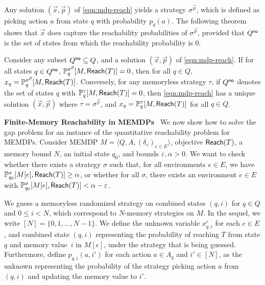 \documentclass[a4paper,USenglish,cleveref, autoref, thm-restate]{lipics-v2021}
\let\epsilon\varepsilon
\def\myparagraph#1{\noindent\textbf{#1}~}
\newcommand{\tuple}[1]{\langle #1 \rangle}
\newcommand*{\pr}{\mathbb{P}}
\newcommand\Reach{\textrm{\sf Reach}}
\begin{document}
Any solution $(\vec{x}, \vec{p})$ of \eqref{eqn:mdp-reach} yields a strategy $\sigma^{\vec{p}}$, 
which is defined as picking action $a$ from state $q$ with probability $p_{q}(a)$. 
The following theorem shows that $\vec{x}$ does capture the reachability probabilities
of $\sigma^{\vec{p}}$, provided that $Q^{\textsf{no}}$ is the set of states from which 
the reachability probability is $0$. 

\begin{theorem}
  \label{thm:mdp-reach-charact}
  Consider any subset $Q^{\textsf{no}} \subseteq Q$, and a solution $(\vec{x}, \vec{p})$ of \eqref{eqn:mdp-reach}.
  If for all states $q \in Q^{\textsf{no}}$, $\pr^{\sigma^{\vec{p}}}_q[M, \Reach(T)] = 0$,
  then for all $q\in Q$, $x_q = \pr^{\sigma^{\vec{p}}}_q[M, \Reach(T)]$.
  Conversely, for any memoryless strategy $\tau$, if $Q^{\textsf{no}}$ denotes the set 
  of states $q$ with $\pr^{\tau}_q[M, \Reach(T)] = 0$, then 
  \eqref{eqn:mdp-reach} has a unique solution $(\vec{x}, \vec{p})$ where $\tau = \sigma^{\vec{p}}$,
  and $x_q = \pr^{\tau}_q[M, \Reach(T)]$ for all $q \in Q$.
\end{theorem}

\myparagraph{Finite-Memory Reachability in MEMDPs}
We now show how to solve the gap problem for an instance of the quantitative reachability problem for MEMDPs.
Consider MEMDP $M=\tuple{Q,A,(\delta_e)_{e\in E}}$, objective $\Reach(T)$, a memory bound $N$,
an initial state $q_0$, and bounds $\epsilon,\alpha>0$.
We want to check whether there exists a strategy $\sigma$ such that, for all environments $e \in E$, 
we have $\pr_{q_0}^\sigma[M[e],\Reach(T)]\geq \alpha$,
or whether for all $\sigma$, there exists an environment $e \in E$ with 
$\pr_{q_0}^\sigma[M[e],\Reach(T)]< \alpha-\epsilon$.

We guess a memoryless randomized strategy on combined states $(q,i)$ for $q \in Q$ and $0\leq i< N$,
which correspond to $N$-memory strategies on $M$.
In the sequel, we write $[N] = \{0,1,\dots,N-1\}$.
We define the unknown variable $x_{q,i}^e$ for each $e \in E$, and combined state $(q,i)$
representing the probability of reaching $T$ from state $q$ and memory value~$i$ in $M[e]$, under the strategy that is being guessed.
Furthermore, define $p_{q,i}(a,i')$ for each action $a \in A_q$ and $i' \in [N]$, as the unknown representing 
the probability of the strategy picking action $a$ from $(q,i)$ and updating the memory value to $i'$.
\end{document}
